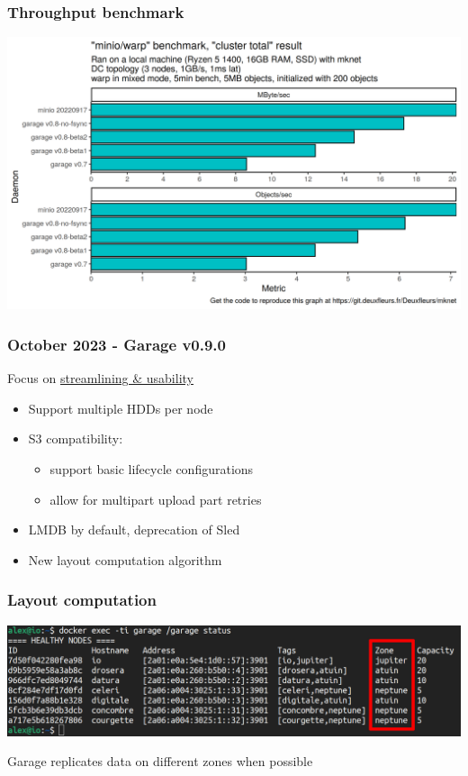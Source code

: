 \documentclass[aspectratio=169]{beamer}
\begin{document}
\begin{frame}
	\frametitle{Throughput benchmark}
	\begin{center}
		\includegraphics[width=.7\linewidth]{../assets/io-0.7-0.8-minio.png}
	\end{center}
\end{frame}


\begin{frame}
	\frametitle{October 2023 - Garage v0.9.0}
	Focus on \underline{streamlining \& usability}
	\vspace{2em}
	\begin{itemize}
		\item Support multiple HDDs per node
			\vspace{1em}
		\item S3 compatibility: 
			\vspace{1em}
			\begin{itemize}
				\item support basic lifecycle configurations
					\vspace{.5em}
				\item allow for multipart upload part retries
			\end{itemize}
			\vspace{1em}
		\item LMDB by default, deprecation of Sled
			\vspace{1em}
		\item New layout computation algorithm
	\end{itemize}
\end{frame}


\begin{frame}
	\frametitle{Layout computation}
	\begin{center}
		\includegraphics[width=\linewidth]{../assets/location-aware.png}
	\end{center}
	\vspace{2em}
	Garage replicates data on different zones when possible
\end{frame}
\end{document}
